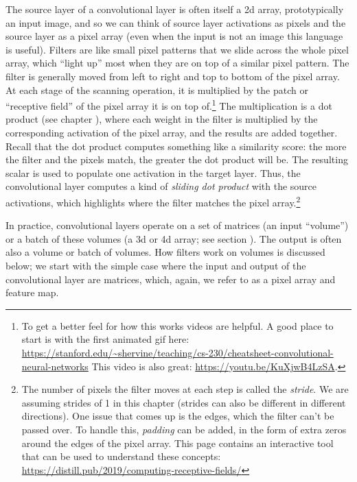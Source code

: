  The source layer of a convolutional layer is often itself a 2d array, prototypically an input image, and so we can think of source layer activations as pixels and the source layer as a pixel array (even when the input is not an image this language is useful). Filters are like small pixel patterns that we slide across the whole pixel array, which ``light up'' most when they are on top of a similar pixel pattern. The filter is generally moved from left to right and top to bottom of the pixel array. At each stage of the scanning operation, it is multiplied by the patch or ``receptive field''  of the pixel array it is on top of.\footnote{To get a better feel for how this works videos are helpful. A good place  to start is with the first animated gif here: \url{https://stanford.edu/~shervine/teaching/cs-230/cheatsheet-convolutional-neural-networks} This video is also great: \url{https://youtu.be/KuXjwB4LzSA}.} The multiplication is a dot product (see chapter ), where each weight in the filter is multiplied by the corresponding activation of the pixel array, and the results are added together. Recall that the dot product computes something like a similarity score: the more the filter and the pixels match, the greater the dot product will be. The resulting scalar is used to populate one activation in the target layer. Thus, the convolutional layer computes a kind of \emph{sliding dot product} with the source activations, which highlights where the filter matches the pixel array.\footnote{The number of pixels the filter moves at each step is called the \emph{stride}. We are assuming strides of 1 in this chapter (strides can also be different in different directions). One issue that comes up is the edges, which the filter can't be passed over. To handle this, \emph{padding} can be added, in the form of extra zeros around the edges of the pixel array. This page contains an interactive tool that can be used to understand these concepts: \url{https://distill.pub/2019/computing-receptive-fields/}}

In practice, convolutional layers operate on a set of matrices  (an input ``volume'') or a batch of these volumes (a 3d or 4d array; see section ). The output is often also a volume or batch of volumes. How filters work on volumes is discussed below; we start with the simple case where the input and output of the convolutional layer are matrices, which, again, we refer to as a pixel array and feature map.

